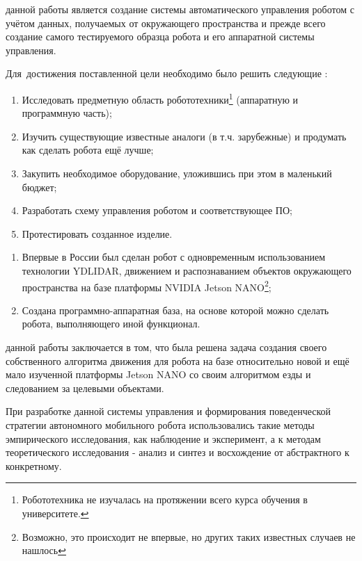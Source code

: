 
{\actuality}

{\progress}

{\aim} данной работы является создание системы автоматического управления роботом с учётом данных, получаемых от окружающего пространства и прежде всего создание самого тестируемого образца робота и его аппаратной системы управления. 

Для~достижения поставленной цели необходимо было решить следующие {\tasks}:
\begin{enumerate}
  \item Исследовать предметную область робототехники\footnote{Робототехника не изучалась на протяжении всего курса обучения в университете.} (аппаратную и программную часть);
  \item Изучить существующие известные аналоги (в т.ч. зарубежные) и продумать как сделать робота ещё лучше;
  \item Закупить необходимое оборудование, уложившись при этом в маленький бюджет; 
  \item Разработать схему управления роботом и соответствующее ПО;
  \item Протестировать созданное изделие.
\end{enumerate}


{\novelty}
\begin{enumerate}
  \item Впервые в России был сделан робот с одновременным использованием технологии YDLIDAR, движением и распознаванием объектов окружающего пространства на базе платформы NVIDIA Jetson NANO\footnote{Возможно, это происходит не впервые, но других таких известных случаев не нашлось};
  \item Создана программно-аппаратная база, на основе которой можно сделать робота, выполняющего иной функционал.
\end{enumerate}

{\influence} данной работы заключается в том, что была решена задача создания своего собственного алгоритма движения для робота на базе относительно новой и ещё мало изученной платформы Jetson NANO со своим алгоритмом езды и следованием за целевыми объектами.

{\methods} При разработке данной системы управления и формирования поведенческой стратегии автономного мобильного робота использовались такие методы эмпирического исследования, как наблюдение и эксперимент, а к методам теоретического исследования - анализ и синтез и восхождение от абстрактного к конкретному.
